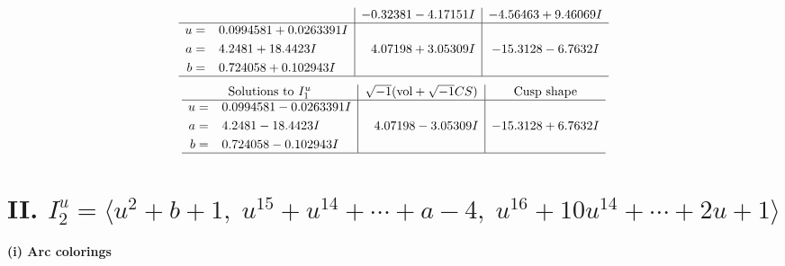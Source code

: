 \documentclass[1p]{elsarticle_modified}
\theoremstyle{definition}
\newcommand{\I}{\sqrt{-1}}
\begin{document}
$$\begin{array}{c|c|c}
 & -0.32381 - 4.17151 I & -4.56463 + 9.46069 I \\ \hline\begin{aligned}
u &= \phantom{-}0.0994581 + 0.0263391 I \\
a &= \phantom{-}4.2481 + 18.4423 I \\
b &= \phantom{-}0.724058 + 0.102943 I\end{aligned}
 & \phantom{-}4.07198 + 3.05309 I & -15.3128 - 6.7632 I\\
 \hline 
 \end{array}$$\newpage$$\begin{array}{c|c|c}  
\text{Solutions to }I^u_{1}& \I (\text{vol} + \sqrt{-1}CS) & \text{Cusp shape}\\
 \hline 
\begin{aligned}
u &= \phantom{-}0.0994581 - 0.0263391 I \\
a &= \phantom{-}4.2481 - 18.4423 I \\
b &= \phantom{-}0.724058 - 0.102943 I\end{aligned}
 & \phantom{-}4.07198 - 3.05309 I & -15.3128 + 6.7632 I\\
 \hline 
 \end{array}$$\newpage\newpage\renewcommand{\arraystretch}{1}
\centering \section*{II. $I^u_{2}= \langle u^2+b+1,\;u^{15}+u^{14}+\cdots+a-4,\;u^{16}+10 u^{14}+\cdots+2 u+1 \rangle$}
\flushleft \textbf{(i) Arc colorings}\\
\end{document}
